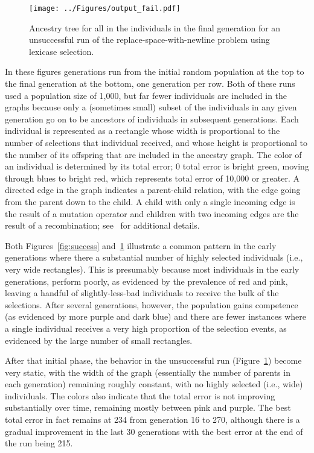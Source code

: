 \documentclass{sig-alternate}
\begin{document}
\begin{figure}[p]
	\centering
	\texttt{[image: ../Figures/output\_fail.pdf]}
	\caption{Ancestry tree for all in the individuals in the final generation for an unsuccessful run of the replace-space-with-newline problem using lexicase selection.}
	\label{fig:fail}
\end{figure}

In these figures generations run from the initial random population at the top to the final generation at the bottom, one generation per row.  Both of these runs used a population size of 1,000, but far fewer individuals are included in the graphs because only a (sometimes small) subset of the individuals in any given generation go on to be ancestors of individuals in subsequent generations. Each individual is represented as a rectangle whose width is proportional to the number of selections that individual received, and whose height is proportional to the number of its offspring that are included in the ancestry graph. 
The color of an individual is determined by its total error; 0 total error is bright green, moving through blues to bright red, which represents total error of 10,000 or greater. A directed edge in the graph indicates a parent-child relation, with the edge going from the parent down to the child. A child with only a single incoming edge is the result of a mutation operator and children with two incoming edges are the result of a recombination; see~\cite{Helmuth:2015:dissertation,Spector:2013:GPTP} for additional details.

Both Figures~\ref{fig:success} and~\ref{fig:fail} illustrate a common pattern in the early generations where there a substantial number of highly selected individuals (i.e., very wide rectangles). This is presumably because most individuals in the early generations, perform poorly, as evidenced by the prevalence of red and pink, leaving a handful of slightly-less-bad individuals to receive the bulk of the selections. After several generations, however, the population gains competence (as evidenced by more purple and dark blue) and there are fewer instances where a single individual receives a very high proportion of the selection events, as evidenced by the large number of small rectangles.

After that initial phase, the behavior in the unsuccessful run (Figure~\ref{fig:fail}) become very static, with the width of the graph (essentially the number of parents in each generation) remaining roughly constant, with no highly selected (i.e., wide) individuals. The colors also indicate that the total error is not improving substantially over time, remaining mostly between pink and purple. The best total error in fact remains at 234 from generation 16 to 270, although there is a gradual improvement in the last 30 generations with the best error at the end of the run being 215.
\end{document}
